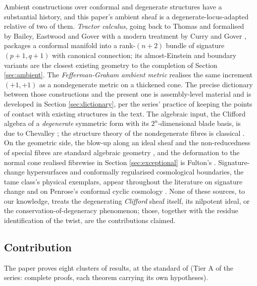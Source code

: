 \documentclass[11pt]{article}
\theoremstyle{definition}
\begin{document}
Ambient constructions over conformal and degenerate structures have a substantial history, and this paper's ambient sheaf is a degenerate-locus-adapted relative of two of them. \emph{Tractor calculus}, going back to Thomas and formalised by Bailey, Eastwood and Gover \cite{BEG1994} with a modern treatment by Curry and Gover \cite{CurryGover2018}, packages a conformal manifold into a rank-$(n{+}2)$ bundle of signature $(p{+}1,q{+}1)$ with canonical connection; its almost-Einstein and boundary variants are the closest existing geometry to the completion of Section \ref{sec:ambient}. The \emph{Fefferman-Graham ambient metric} \cite{FG1985, FG2012} realises the same increment $(+1,+1)$ as a nondegenerate metric on a thickened cone. The precise dictionary between those constructions and the present one is assembly-level material and is developed in Section \ref{sec:dictionary}, per the series' practice of keeping the points of contact with existing structures in the text. The algebraic input, the Clifford algebra of a \emph{degenerate} symmetric form with its $2^n$-dimensional blade basis, is due to Chevalley \cite{Chevalley1997}; the structure theory of the nondegenerate fibres is classical \cite{Porteous1995, Lounesto2001, Lam2005}. On the geometric side, the blow-up along an ideal sheaf and the non-reducedness of special fibres are standard algebraic geometry \cite{Hartshorne1977}, and the deformation to the normal cone realised fibrewise in Section \ref{sec:exceptional} is Fulton's \cite[Ch.~5]{Fulton1998}. Signature-change hypersurfaces and conformally regularised cosmological boundaries, the tame class's physical exemplars, appear throughout the literature on signature change and on Penrose's conformal cyclic cosmology \cite{Penrose2010}. None of these sources, to our knowledge, treats the degenerating \emph{Clifford} sheaf itself, its nilpotent ideal, or the conservation-of-degeneracy phenomenon; those, together with the residue identification of the twist, are the contributions claimed.

\subsection*{Contribution}

The paper proves eight clusters of results, at the standard of \cite{ButlerT1} (Tier A of the series: complete proofs, each theorem carrying its own hypotheses).
\end{document}

